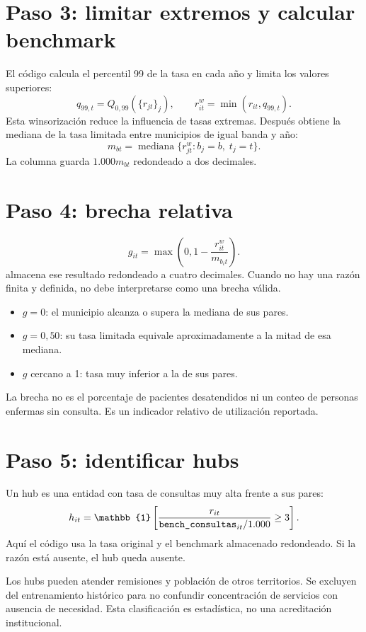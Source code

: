 \documentclass[11pt,a4paper]{report}
\newcommand{\campo}[1]{\texttt{\detokenize{#1}}}
\begin{document}
\section{Paso 3: limitar extremos y calcular benchmark}
El código calcula el percentil 99 de la tasa en cada año y limita los valores superiores:
\[
q_{99,t}=Q_{0,99}(\{r_{jt}\}_j), \qquad
r^w_{it}=\min(r_{it},q_{99,t}).
\]
Esta winsorización reduce la influencia de tasas extremas. Después obtiene la mediana de la tasa limitada entre municipios de igual banda y año:
\[
m_{bt}=\operatorname{mediana}\{r^w_{jt}:b_j=b,\;t_j=t\}.
\]
La columna \campo{bench_consultas} guarda $1.000m_{bt}$ redondeado a dos decimales.

\section{Paso 4: brecha relativa}
\[
g_{it}=\max\left(0,1-\frac{r^w_{it}}{m_{b_i t}}\right).
\]
\campo{brecha_consultas} almacena ese resultado redondeado a cuatro decimales. Cuando no hay una razón finita y definida, no debe interpretarse como una brecha válida.
\begin{itemize}
\item $g=0$: el municipio alcanza o supera la mediana de sus pares.
\item $g=0,50$: su tasa limitada equivale aproximadamente a la mitad de esa mediana.
\item $g$ cercano a 1: tasa muy inferior a la de sus pares.
\end{itemize}
La brecha no es el porcentaje de pacientes desatendidos ni un conteo de personas enfermas sin consulta. Es un indicador relativo de utilización reportada.

\section{Paso 5: identificar hubs}
Un hub es una entidad con tasa de consultas muy alta frente a sus pares:
\[
h_{it}=\mathbb{1}\left[
\frac{r_{it}}{\campo{bench_consultas}_{it}/1.000}\geq3
\right].
\]
Aquí el código usa la tasa original y el benchmark almacenado redondeado. Si la razón está ausente, el hub queda ausente.

Los hubs pueden atender remisiones y población de otros territorios. Se excluyen del entrenamiento histórico para no confundir concentración de servicios con ausencia de necesidad. Esta clasificación es estadística, no una acreditación institucional.
\end{document}
